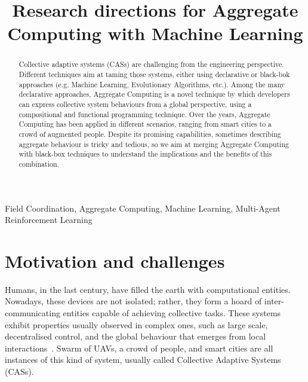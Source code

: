 \documentclass[conference]{IEEEtran}
\begin{document}
\title{Research directions for Aggregate Computing with Machine Learning}

\author{
}

\maketitle
\begin{abstract}
    Collective adaptive systems (CASs) are challenging from the engineering perspective. 
%
    Different techniques aim at taming those systems, either using declarative or black-bok approaches (e.g. Machine Learning, Evolutionary Algorithms, etc.).
%
    Among the many declarative approaches, Aggregate Computing is a novel technique by which developers can express collective system behaviours from a global perspective, using a compositional and functional programming technique.
%
    Over the years, Aggregate Computing has been applied in different scenarios, ranging from smart cities to a crowd of augmented people. 
%
    Despite its promising capabilities, sometimes describing aggregate behaviour is tricky and tedious, so we aim at merging Aggregate Computing with black-box techniques to understand the implications and the benefits of this combination.
\end{abstract}
\begin{IEEEkeywords}
Field Coordination, Aggregate Computing, Machine Learning, Multi-Agent Reinforcement Learning
\end{IEEEkeywords}

\section{Motivation and challenges}
Humans, in the last century, have filled the earth with computational entities. 
%
%
Nowadays, these devices are not isolated; rather, they form a hoard of inter-communicating entities capable of achieving collective tasks.
% 
These systems exhibit properties usually observed in complex ones, such as large scale, decentralised control, and the global behaviour that emerges from local interactions~\cite{DBLP:conf/huc/Ferscha15}.
% 
Swarm of UAVs, a crowd of people, and smart cities are all instances of this kind of system, usually called Collective Adaptive Systems (CASs).
\end{document}
